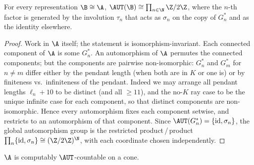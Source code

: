 \begin{lemma}\label{autgroup}
For every representation $\B\cong\A$, $\AUT(\B)\cong\prod_{n\in\N}\Z/2\Z$, where the
$n$-th factor is generated by the involution $\tau_n$ that acts as $\sigma_n$ on the
copy of $G_n^\ast$ and as the identity elsewhere.
\end{lemma}

\begin{proof}
Work in $\A$ itself; the statement is isomorphism-invariant. Each connected
component of $\A$ is some $G_n^\ast$. An automorphism of $\A$ permutes the
connected components; but the components are pairwise non-isomorphic: $G_n^\ast$ and
$G_m^\ast$ for $n\neq m$ differ either by the pendant length (when both are in $K$
or one is) or by finiteness vs.\ infiniteness of the pendant. Indeed we may arrange
all pendant lengths $\ell_n+10$ to be distinct (and all $\geq 11$), and the
no-$K$ ray case to be the unique infinite case for each component, so that
distinct components are non-isomorphic. Hence every automorphism fixes each
component setwise, and restricts to an automorphism of that component. Since
$\AUT(G_n^\ast)=\{\mathrm{id},\sigma_n\}$, the global automorphism group is the
restricted product\,/\,product $\prod_n\{\mathrm{id},\sigma_n\}\cong(\Z/2\Z)^\N$, with
each coordinate chosen independently.
\end{proof}

\begin{lemma}[Proof of (a)]\label{conemany}
$\A$ is computably $\AUT$-countable on a cone.
\end{lemma}

